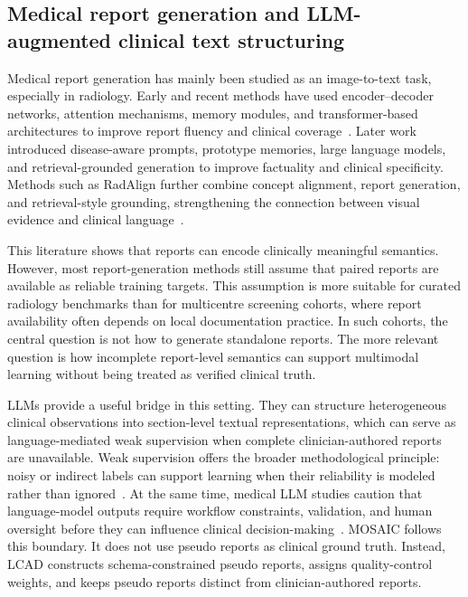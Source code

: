 \documentclass[11pt, a4paper]{article}
\theoremstyle{plain}
\theoremstyle{definition}
\begin{document}
\subsection{Medical report generation and LLM-augmented clinical text structuring}

Medical report generation has mainly been studied as an image-to-text task, especially in radiology. Early and recent methods have used encoder--decoder networks, attention mechanisms, memory modules, and transformer-based architectures to improve report fluency and clinical coverage~\cite{monshi2020radiology_reports,pang2023medical_report_generation}. Later work introduced disease-aware prompts, prototype memories, large language models, and retrieval-grounded generation to improve factuality and clinical specificity. Methods such as RadAlign further combine concept alignment, report generation, and retrieval-style grounding, strengthening the connection between visual evidence and clinical language~\cite{gu2026radalign}.

This literature shows that reports can encode clinically meaningful semantics. However, most report-generation methods still assume that paired reports are available as reliable training targets. This assumption is more suitable for curated radiology benchmarks than for multicentre screening cohorts, where report availability often depends on local documentation practice. In such cohorts, the central question is not how to generate standalone reports. The more relevant question is how incomplete report-level semantics can support multimodal learning without being treated as verified clinical truth.

LLMs provide a useful bridge in this setting. They can structure heterogeneous clinical observations into section-level textual representations, which can serve as language-mediated weak supervision when complete clinician-authored reports are unavailable. Weak supervision offers the broader methodological principle: noisy or indirect labels can support learning when their reliability is modeled rather than ignored~\cite{ratner2020snorkel}. At the same time, medical LLM studies caution that language-model outputs require workflow constraints, validation, and human oversight before they can influence clinical decision-making~\cite{thirunavukarasu2023llm_medicine}. MOSAIC follows this boundary. It does not use pseudo reports as clinical ground truth. Instead, LCAD constructs schema-constrained pseudo reports, assigns quality-control weights, and keeps pseudo reports distinct from clinician-authored reports.
\end{document}

